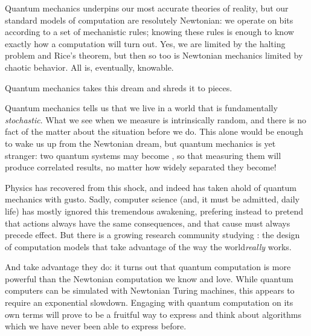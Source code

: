 Quantum mechanics underpins our most accurate theories of
reality,\footnotemark{} but our standard models of computation are resolutely
Newtonian: we operate on bits according to a set of mechanistic rules; knowing
these rules is enough to know exactly how a computation will turn out.  Yes, we
are limited by the halting problem and Rice's theorem, but then so too is
Newtonian mechanics limited by chaotic behavior.  All is, eventually, knowable.


Quantum mechanics takes this dream and shreds it to pieces.

Quantum mechanics tells us that we live in a world that is fundamentally
\emph{stochastic}.  What we see when we measure is intrinsically random, and
there is no fact of the matter about the situation before we do.\footnotemark{}
This alone would be enough to wake us up from the Newtonian dream, but quantum
mechanics is yet stranger: two quantum systems may become , so
that measuring them will produce correlated results, no matter how widely
separated they become!


Physics has recovered from this shock, and indeed has taken ahold of quantum
mechanics with gusto.  Sadly, computer science (and, it must be admitted, daily
life) has mostly ignored this tremendous awakening, prefering instead to pretend
that actions always have the same consequences, and that cause must always
precede effect.  But there is a growing research community studying
: the design of computation models that take advantage
of the way the world\emph{really} works.  

And take advantage they do: it turns out that quantum computation is more
powerful than the Newtonian computation we know and love.  While quantum
computers can be simulated with Newtonian Turing machines, this appears to
require an exponential slowdown.  \citeme{}  Engaging with quantum computation
on its own terms will prove to be a fruitful way to express and think about
algorithms which we have never been able to express before.

